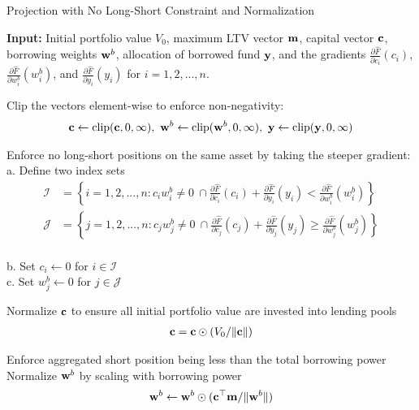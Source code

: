 \documentclass{article} %
\newcommand{\INDSTATE}[1][1]{\hspace{#1\algorithmicindent}}
\theoremstyle{plain}
\theoremstyle{definition} %
\begin{document}
  \begin{algorithm}[th]
    \caption{Projection with No Long-Short Constraint and Normalization}\label{alg:projection}
    \begin{algorithmic}[1]
    \STATE \textbf{Input:} 
    Initial portfolio value $V_0$, maximum LTV vector ${\bf m}$,
    capital vector ${\bf c}$, borrowing weights ${\bf w}^b$, allocation of borrowed fund $\bf{y}$,
    and the gradients 
    $\frac{\partial \hat F}{\partial c_i}(c_i)$, $\frac{\partial \hat F}{\partial w^b_i}(w^b_i)$, and 
    $\frac{\partial \hat F}{\partial y_i}(y_i)$ for $i=1,2,...,n$.

    \STATE Clip the vectors element-wise to enforce non-negativity:
    \begin{align*}
    {\bf c} \leftarrow \text{clip}({\bf c} , 0, \infty),\ {\bf w}^b \leftarrow \text{clip}({\bf w}^b, 0, \infty),\ {\bf y} \leftarrow \text{clip}( {\bf y}, 0, \infty)
    \end{align*}
    
    \STATE Enforce no long-short positions on the same asset by taking the steeper gradient:\\
    \INDSTATE a. Define two index sets
    \begin{align*} 
    \mathcal{I} &= \left\{
      i=1,2,...,n: c_i w^b_i\neq 0\ \cap 
    \frac{\partial \hat F}{\partial c_i}(c_i) + \frac{\partial \hat F}{\partial y_i}(y_i) < \frac{\partial \hat F}{\partial w^b_i}(w^b_i)
    \right\}\\
    \mathcal{J} &= \left\{j=1,2,...,n: c_jw^b_j\neq 0\ \cap 
    \frac{\partial \hat F}{\partial c_j}(c_j) + \frac{\partial \hat F}{\partial y_j}(y_j) \geq \frac{\partial \hat F}{\partial w^b_j}(w^b_j)\right\}
  \end{align*}\\
    \INDSTATE b. Set $c_i \leftarrow 0$ for $i \in \mathcal{I}$\\
    \INDSTATE c. Set $w^b_j \leftarrow 0$ for $j \in \mathcal{J}$
    
    \STATE Normalize ${\bf c}$ to ensure all initial portfolio value are invested into lending pools
    \begin{align*}{\bf c} = {\bf c} \odot (V_0/ \|{\bf c}\|) \end{align*}
    
    \STATE Enforce aggregated short position being less than the total borrowing power
        \STATE Normalize ${\bf w}^b$ by scaling with borrowing power
        \begin{align*}{\bf w}^b \leftarrow {\bf w}^b \odot ({\bf c}^\top {\bf m}/ \|{\bf w}^b\|) \end{align*}
    \ENDIF
    

\end{algorithmic}
\end{algorithm}
\end{document}
